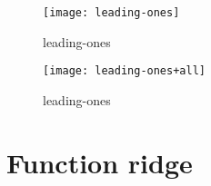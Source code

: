 \begin{center}
\begin{figure}[h]
\centering
\texttt{[image: leading-ones]}
\caption{leading-ones}
\end{figure}
\end{center}

\begin{center}
\begin{figure}[h]
\centering
\texttt{[image: leading-ones+all]}
\caption{leading-ones}
\end{figure}
\end{center}

\newpage

\section{Function ridge}
